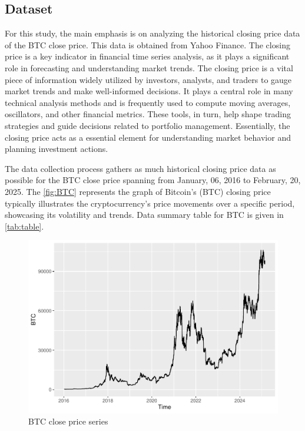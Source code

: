 \documentclass[]{interact}
\theoremstyle{plain}%
\theoremstyle{definition}
\theoremstyle{remark}
\begin{document}
\subsection{Dataset}\label{dataset}

For this study, the main emphasis is on analyzing the historical closing
price data of the BTC close price. This data is obtained from Yahoo
Finance. The closing price is a key indicator in financial time series
analysis, as it plays a significant role in forecasting and
understanding market trends. The closing price is a vital piece of
information widely utilized by investors, analysts, and traders to gauge
market trends and make well-informed decisions. It plays a central role
in many technical analysis methods and is frequently used to compute
moving averages, oscillators, and other financial metrics. These tools,
in turn, help shape trading strategies and guide decisions related to
portfolio management. Essentially, the closing price acts as a essential
element for understanding market behavior and planning investment
actions.

The data collection process gathers as much historical closing price
data as possible for the BTC close price spanning from January, 06, 2016
to February, 20, 2025. The \autoref{fig:BTC} represents the graph of
Bitcoin's (BTC) closing price typically illustrates the cryptocurrency's
price movements over a specific period, showcasing its volatility and
trends. Data summary table for BTC is given in \autoref{tab:table}.

\begin{figure}

{\centering \includegraphics[width=0.85\linewidth]{Colloque_files/figure-latex/BTC-1} 

}

\caption{BTC close price series}\label{fig:BTC}
\end{figure}
\end{document}
